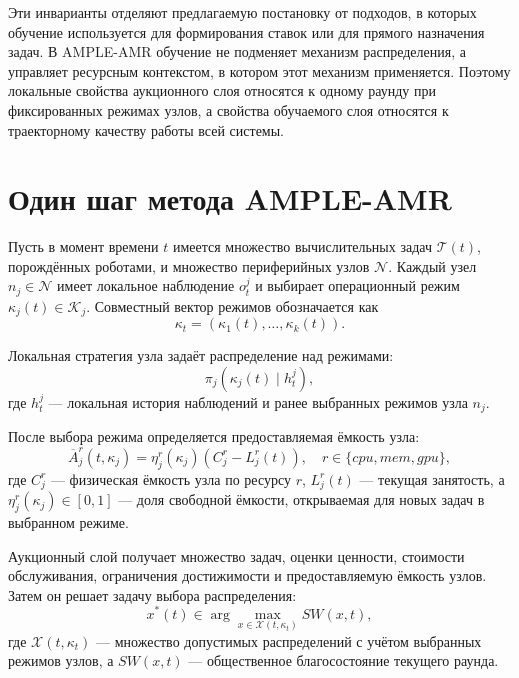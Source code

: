 Эти инварианты отделяют предлагаемую постановку от подходов, в которых обучение используется для формирования ставок или для прямого назначения задач. В AMPLE-AMR обучение не подменяет механизм распределения, а управляет ресурсным контекстом, в котором этот механизм применяется. Поэтому локальные свойства аукционного слоя относятся к одному раунду при фиксированных режимах узлов, а свойства обучаемого слоя относятся к траекторному качеству работы всей системы.

\section{Один шаг метода AMPLE-AMR}

Пусть в момент времени $t$ имеется множество вычислительных задач $\mathcal{T}(t)$, порождённых роботами, и множество периферийных узлов $\mathcal{N}$. Каждый узел $n_j \in \mathcal{N}$ имеет локальное наблюдение $o^j_t$ и выбирает операционный режим $\kappa_j(t) \in \mathcal{K}_j$. Совместный вектор режимов обозначается как
\begin{equation}
    \kappa_t = \left( \kappa_1(t),\ldots,\kappa_k(t) \right).
    \label{eq:ch5_joint_mode}
\end{equation}

Локальная стратегия узла задаёт распределение над режимами:
\begin{equation}
    \pi_j(\kappa_j(t) \mid h^j_t),
    \label{eq:ch5_local_policy}
\end{equation}
где $h^j_t$ --- локальная история наблюдений и ранее выбранных режимов узла $n_j$.

После выбора режима определяется предоставляемая ёмкость узла:
\begin{equation}
    \overline{A}^{r}_j(t,\kappa_j) = \eta^{r}_j(\kappa_j) \left(C^{r}_j - L^{r}_j(t)\right), \quad r \in \{cpu,mem,gpu\},
    \label{eq:ch5_exposed_capacity}
\end{equation}
где $C^{r}_j$ --- физическая ёмкость узла по ресурсу $r$, $L^{r}_j(t)$ --- текущая занятость, а $\eta^{r}_j(\kappa_j) \in [0,1]$ --- доля свободной ёмкости, открываемая для новых задач в выбранном режиме.

Аукционный слой получает множество задач, оценки ценности, стоимости обслуживания, ограничения достижимости и предоставляемую ёмкость узлов. Затем он решает задачу выбора распределения:
\begin{equation}
    x^*(t) \in \arg\max_{x \in \mathcal{X}(t,\kappa_t)} SW(x,t),
    \label{eq:ch5_auction_allocation}
\end{equation}
где $\mathcal{X}(t,\kappa_t)$ --- множество допустимых распределений с учётом выбранных режимов узлов, а $SW(x,t)$ --- общественное благосостояние текущего раунда.

